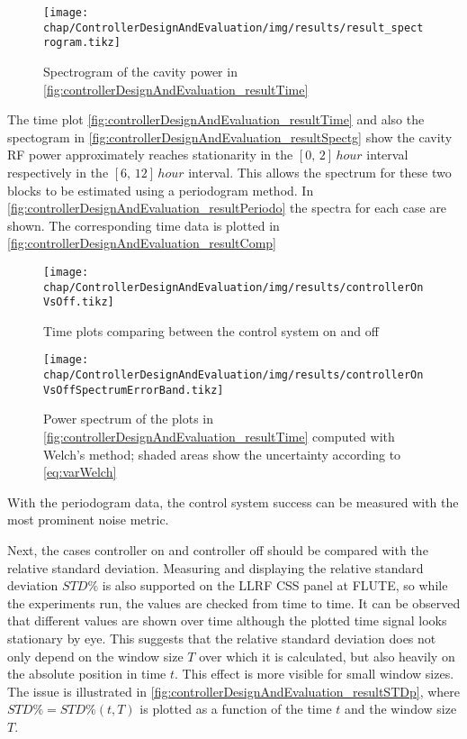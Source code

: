 \begin{figure}[tb]
	\centering
	\texttt{[image: chap/ControllerDesignAndEvaluation/img/results/result\_spectrogram.tikz]}
	\caption{Spectrogram of the cavity power in \autoref{fig:controllerDesignAndEvaluation_resultTime}}
	\label{fig:controllerDesignAndEvaluation_resultSpectg}
\end{figure}

The time plot \autoref{fig:controllerDesignAndEvaluation_resultTime} and also the spectogram in \autoref{fig:controllerDesignAndEvaluation_resultSpectg} show the cavity RF power approximately reaches stationarity in the $[0,\,2]\,\si{hour}$ interval respectively in the $[6,\,12]\, \si{hour}$ interval.
This allows the spectrum for these two blocks to be estimated using a periodogram method. In \autoref{fig:controllerDesignAndEvaluation_resultPeriodo} the spectra for each case are shown. The corresponding time data is plotted in \autoref{fig:controllerDesignAndEvaluation_resultComp}

\begin{figure}[tb]
	\centering
	\texttt{[image: chap/ControllerDesignAndEvaluation/img/results/controllerOnVsOff.tikz]}
	\caption{Time plots comparing between the control system on and off}
	\label{fig:controllerDesignAndEvaluation_resultComp}
\end{figure}

\begin{figure}[tb]
	\centering
	\texttt{[image: chap/ControllerDesignAndEvaluation/img/results/controllerOnVsOffSpectrumErrorBand.tikz]}
	\caption{Power spectrum of the plots in \autoref{fig:controllerDesignAndEvaluation_resultTime} computed with Welch's method; shaded areas show the uncertainty according to \autoref{eq:varWelch}}
	\label{fig:controllerDesignAndEvaluation_resultPeriodo}
\end{figure}

With the periodogram data, the control system success can be measured with the most prominent noise metric.

Next, the cases controller on and controller off should be compared with the relative standard deviation. Measuring and displaying the relative standard deviation $STD\%$ is also supported on the LLRF CSS panel at FLUTE, so while the experiments run, the values are checked from time to time. It can be observed that different values are shown over time although the plotted time signal looks stationary by eye. This suggests that the relative standard deviation does not only depend on the window size $T$ over which it is calculated, but also heavily on the absolute position in time $t$. This effect is more visible for small window sizes. The issue is illustrated in \autoref{fig:controllerDesignAndEvaluation_resultSTDp}, where $STD\%=STD\%(t,T)$ is plotted as a function of the time $t$ and the window size $T$.

